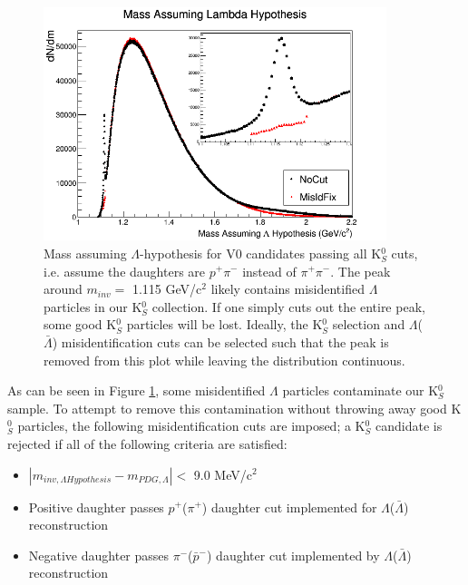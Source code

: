 \begin{figure}[h]
  \centering
  \includegraphics[width=100mm]{3_DataSelection/Figures/MassAssumingLambdaHypothesis.png}
  \caption[$\Lambda$ contamination in K$^{0}_{S}$ collection]{Mass assuming $\Lambda$-hypothesis for V0 candidates passing all K$^{0}_{S}$ cuts, i.e. assume the daughters are $p^{+}\pi^{-}$ instead of $\pi^{+}\pi^{-}$.  The peak around $m_{inv} = $ 1.115 GeV/c$^{2}$ likely contains misidentified $\Lambda$ particles in our K$^{0}_{S}$ collection.  If one simply cuts out the entire peak, some good K$^{0}_{S}$ particles will be lost.  Ideally, the K$^{0}_{S}$ selection and $\Lambda$($\bar{\Lambda}$) misidentification cuts can be selected such that the peak is removed from this plot while leaving the distribution continuous.}
  \label{fig:MassAssLamHyp}
\end{figure}

As can be seen in Figure \ref{fig:MassAssLamHyp}, some misidentified $\Lambda$ particles contaminate our K$^{0}_{S}$ sample.  To attempt to remove this contamination without throwing away good K$^{0}_{S}$ particles, the following misidentification cuts are imposed; a K$^{0}_{S}$ candidate is rejected if all of the following criteria are satisfied:
\begin{itemize}
 \item $|m_{inv,\Lambda Hypothesis} - m_{PDG,\Lambda}| < $ 9.0 MeV/c$^{2}$
 \item Positive daughter passes $p^{+}$($\pi^{+}$) daughter cut implemented for $\Lambda$($\bar{\Lambda}$) reconstruction
 \item Negative daughter passes $\pi^{-}$($\bar{p}^{-}$) daughter cut implemented by $\Lambda$($\bar{\Lambda}$) reconstruction
\end{itemize} 